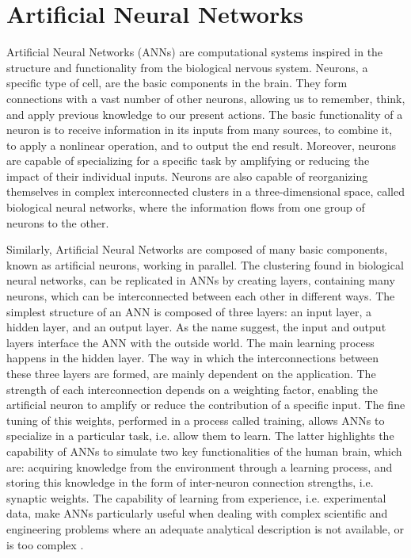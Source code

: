 \section{Artificial Neural Networks}

Artificial Neural Networks (ANNs) are computational systems inspired in the structure and functionality from the biological nervous system. Neurons, a specific type of cell, are the basic components in the brain. They form connections with a vast number of other neurons, allowing us to remember, think, and apply previous knowledge to our present actions. The basic functionality of a neuron is to receive information in its inputs from many sources, to combine it, to apply a nonlinear operation, and to output the end result. Moreover, neurons are capable of specializing for a specific task by amplifying or reducing the impact of their individual inputs. Neurons are also capable of reorganizing themselves in complex interconnected clusters in a three-dimensional space, called biological neural networks, where the information flows from one group of neurons to the other.

Similarly, Artificial Neural Networks are composed of many basic components, known as artificial neurons, working in parallel. The clustering found in biological neural networks, can be replicated in ANNs by creating layers, containing many neurons, which can be interconnected between each other in different ways. The simplest structure of an ANN is composed of three layers: an input layer, a hidden layer, and an output layer. As the name suggest, the input and output layers interface the ANN with the outside world. The main learning process happens in the hidden layer. The way in which the interconnections between these three layers are formed, are mainly dependent on the application. The strength of each interconnection depends on a weighting factor, enabling the artificial neuron to amplify or reduce the contribution of a specific input. The fine tuning of this weights, performed in a process called training, allows ANNs to specialize in a particular task, i.e. allow them to learn. The latter highlights the capability of ANNs to simulate two key functionalities of the human brain, which are: acquiring knowledge from the environment through a learning process, and storing this knowledge in the form of inter-neuron connection strengths, i.e. synaptic weights. The capability of learning from experience, i.e. experimental data, make ANNs particularly useful when dealing with complex scientific and engineering problems where an adequate analytical description is not available, or is too complex  \cite{zhang2003artificial,trebar2007predicting}.

